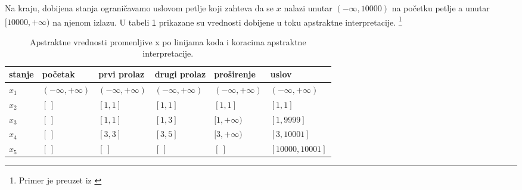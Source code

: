

Na kraju, dobijena stanja ograničavamo uslovom petlje koji zahteva da se $x$ nalazi unutar $(-\infty, 10000)$ na početku petlje a unutar $[10000, +\infty)$ na njenom izlazu. U tabeli \ref{tab:tabela1} prikazane su vrednosti dobijene u toku apstraktne interpretacije. \footnote{Primer je preuzet iz \cite{boulanger}}


\begin{table}[H]
\begin{center}
\caption{Apstraktne vrednosti promenljive x po linijama koda i koracima apstraktne interpretacije.}
\begin{tabular}{|l|l|l|l|l|l|} \hline
stanje& početak& prvi prolaz & drugi prolaz & proširenje & uslov\\ \hline
$x_1$ & $(-\infty, +\infty)$ & $(-\infty, +\infty)$ & $(-\infty, +\infty)$ & $(-\infty, +\infty)$ & $(-\infty, +\infty)$ \\ 
$x_2$ & $[\:]$ & $[1,1]$ & $[1,1]$ & $[1,1]$ & $[1,1]$ \\
$x_3$ & $[\:]$ & $[1,1]$ & $[1,3]$ & $[1,+\infty)$ & $[1,9999]$ \\
$x_4$ & $[\:]$ & $[3,3]$ & $[3,5]$ & $[3,+\infty)$ & $[3,10001]$ \\
$x_5$ & $[\:]$ & $[\:]$ & $[\:]$ & $[\:]$ & $[10000,10001]$ \\ \hline
\end{tabular}
\label{tab:tabela1}
\end{center}
\end{table}

